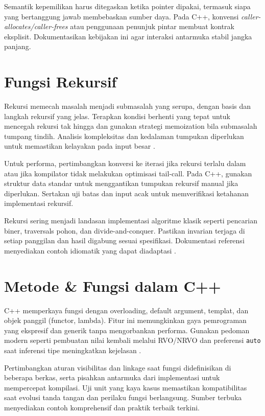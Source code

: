 \documentclass[../main.tex]{subfiles}
\begin{document}
Semantik kepemilikan harus ditegaskan ketika pointer dipakai, termasuk siapa yang bertanggung jawab membebaskan sumber daya. Pada C++, konvensi \emph{caller-allocates/caller-frees} atau penggunaan penunjuk pintar membuat kontrak eksplisit. Dokumentasikan kebijakan ini agar interaksi antarmuka stabil jangka panjang.

\section{Fungsi Rekursif}
Rekursi memecah masalah menjadi submasalah yang serupa, dengan basis dan langkah rekursif yang jelas. Terapkan kondisi berhenti yang tepat untuk mencegah rekursi tak hingga dan gunakan strategi memoization bila submasalah tumpang tindih. Analisis kompleksitas dan kedalaman tumpukan diperlukan untuk memastikan kelayakan pada input besar \parencite{cpp-reference,gnu-c-manual}.

Untuk performa, pertimbangkan konversi ke iterasi jika rekursi terlalu dalam atau jika kompilator tidak melakukan optimisasi tail-call. Pada C++, gunakan struktur data standar untuk menggantikan tumpukan rekursif manual jika diperlukan. Sertakan uji batas dan input acak untuk memverifikasi ketahanan implementasi rekursif.

Rekursi sering menjadi landasan implementasi algoritme klasik seperti pencarian biner, traversals pohon, dan divide-and-conquer. Pastikan invarian terjaga di setiap panggilan dan hasil digabung sesuai spesifikasi. Dokumentasi referensi menyediakan contoh idiomatik yang dapat diadaptasi \parencite{cpp-reference,gnu-c-manual}.

\section{Metode \& Fungsi dalam C++}
C++ memperkaya fungsi dengan overloading, default argument, templat, dan objek panggil (functor, lambda). Fitur ini memungkinkan gaya pemrograman yang ekspresif dan generik tanpa mengorbankan performa. Gunakan pedoman modern seperti pembuatan nilai kembali melalui RVO/NRVO dan preferensi \texttt{auto} saat inferensi tipe meningkatkan kejelasan \parencite{cpp-functions,cpp-reference}.

Pertimbangkan aturan visibilitas dan linkage saat fungsi didefinisikan di beberapa berkas, serta pisahkan antarmuka dari implementasi untuk mempercepat kompilasi. Uji unit yang kaya kasus memastikan kompatibilitas saat evolusi tanda tangan dan perilaku fungsi berlangsung. Sumber terbuka menyediakan contoh komprehensif dan praktik terbaik terkini.
\end{document}
